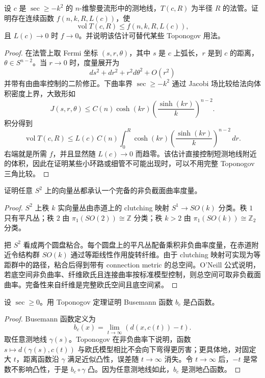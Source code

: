 \documentclass[11pt,a4paper,openany]{ctexbook}
\numberwithin{equation}{chapter}
\begin{document}
\begin{exercise}
设 \(c\) 是 \(\sec\ge -k^2\) 的 \(n\)-维黎曼流形中的测地线，\(T(c,R)\) 为半径 \(R\) 的法管。证明存在连续函数 \(f(n,k,R,L(c))\)，使
\[
\operatorname{vol}T(c,R)\le f(n,k,R,L(c)),
\]
且 \(L(c)\to0\) 时 \(f\to0\)。并说明该估计可替代某些 Toponogov 用法。
\end{exercise}
\begin{proof}
在法管上取 Fermi 坐标 \((s,r,\theta)\)，其中 \(s\) 是 \(c\) 上弧长，\(r\) 是到 \(c\) 的距离，\(\theta\in S^{n-2}\)。当 \(r\to0\) 时，度量展开为
\[
ds^2+dr^2+r^2d\theta^2+O(r^2)
\]
并带有由曲率控制的二阶修正。下曲率界 \(\sec\ge-k^2\) 通过 Jacobi 场比较给法向体积密度上界，大致形如
\[
J(s,r,\theta)\le C(n)\cosh(kr)\left(\frac{\sinh(kr)}{k}\right)^{n-2}.
\]
积分得到
\[
\operatorname{vol}T(c,R)\le L(c)\,C(n)\int_0^R \cosh(kr)\left(\frac{\sinh(kr)}{k}\right)^{n-2}\,dr.
\]
右端就是所需 \(f\)，并且显然随 \(L(c)\to0\) 而趋零。该估计直接控制短测地线附近的体积，因此在证明某些小环路或细管不可能出现时，可以不用完整 Toponogov 三角比较。
\end{proof}

\begin{exercise}
证明任意 \(S^2\) 上的向量丛都承认一个完备的非负截面曲率度量。
\end{exercise}
\begin{proof}
\(S^2\) 上秩 \(k\) 实向量丛由赤道上的 clutching 映射 \(S^1\to SO(k)\) 分类。秩 \(1\) 只有平凡丛；秩 \(2\) 由 \(\pi_1(SO(2))\cong\mathbb Z\) 分类；秩 \(k>2\) 由 \(\pi_1(SO(k))\cong\mathbb Z_2\) 分类。

把 \(S^2\) 看成两个圆盘粘合。每个圆盘上的平凡丛配备乘积非负曲率度量，在赤道附近令结构群 \(SO(k)\) 通过等距线性作用旋转纤维。由于 clutching 映射可实现为等距群中的路径，粘合后得到带有 connection metric 的总空间。O'Neill 公式说明，若底空间非负曲率、纤维欧氏且连接曲率按标准模型控制，则总空间可取非负截面曲率。完备性来自纤维是完整欧氏空间且底空间紧。
\end{proof}

\begin{exercise}
设 \(\sec\ge0\)。用 Toponogov 定理证明 Busemann 函数 \(b_c\) 是凸函数。
\end{exercise}
\begin{proof}
Busemann 函数定义为
\[
b_c(x)=\lim_{t\to\infty}(d(x,c(t))-t).
\]
取任意测地线 \(\gamma(s)\)。Toponogov 在非负曲率下说明，函数 \(s\mapsto d(\gamma(s),c(t))\) 与欧氏模型相比不会向下弯得更厉害；更具体地，对固定大 \(t\)，距离函数沿 \(\gamma\) 满足近似凸性，误差随 \(t\to\infty\) 消失。令 \(t\to\infty\) 后，\(-t\) 是常数不影响凸性，于是 \(b_c\circ\gamma\) 凸。因为任意测地线如此，\(b_c\) 是测地凸函数。
\end{proof}
\end{document}
